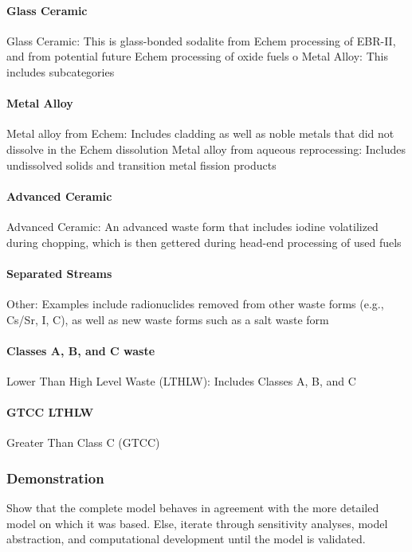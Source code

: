 \paragraph{Glass Ceramic} Glass Ceramic:  This is glass-bonded sodalite from 
Echem processing of EBR-II, and from potential future Echem processing of oxide 
fuels o Metal Alloy: This includes subcategories


\paragraph{Metal Alloy} Metal alloy from Echem: Includes cladding as well as 
noble metals that did not dissolve in the Echem dissolution Metal alloy from 
aqueous reprocessing:  Includes undissolved solids and transition metal fission 
products


\paragraph{Advanced Ceramic} Advanced Ceramic: An advanced waste form that 
includes iodine volatilized during chopping, which is then gettered during 
head-end processing of used fuels


\paragraph{Separated Streams} Other:  Examples include radionuclides removed 
from other waste forms (e.g., Cs/Sr, I, C), as well as new waste forms such as 
a salt waste form

\paragraph{Classes A, B, and C waste} Lower Than High Level Waste (LTHLW): 
Includes Classes A, B, and C

\paragraph{GTCC LTHLW}  Greater Than Class C (GTCC)


\subsubsection{Demonstration}

Show that the complete model behaves in agreement with the more detailed model 
on which it was based. Else, iterate through sensitivity analyses, model 
abstraction, and computational development until the model is validated. 



